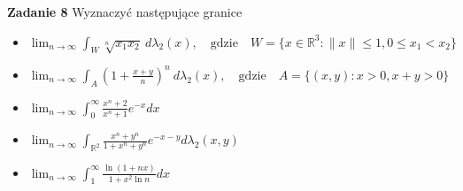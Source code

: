 \documentclass[a4paper,11pt]{article}
\newcommand{\RR}{\mathbb{R}}
\begin{document}
\bigskip

\textbf{Zadanie 8} Wyznaczyć następujące granice 

\begin{itemize}
  \item $\lim_{n \to \infty} \int_{W} \sqrt[n]{x_1x_2}~ d\lambda_2(x),
    \quad \text{gdzie} \quad W = \{x \in \RR^3: \|x\|\le 1, 0\le
    x_1<x_2\} $
  \item $\lim_{n \to \infty} \int_{A} \left( 1+\frac{x+y}{n} \right)^n ~
    d\lambda_2(x), \quad \text{gdzie} \quad A = \{(x,y) : x>0, x+y>0\} $
  \item $\lim_{n \to \infty} \int_{0}^\infty \frac{x^n +2}{x^n + 1}
    e^{-x} dx$
  \item $\lim_{n\to \infty} \int_{\RR^2} \frac{x^n + y^n}{1+x^n + y^n}
    e^{-x-y} d\lambda_2(x,y)$
  \item $\lim_{n\to \infty} \int_1^\infty \frac{\ln(1+nx)}{1+x^2\ln n} dx$
\end{itemize}
\end{document}
